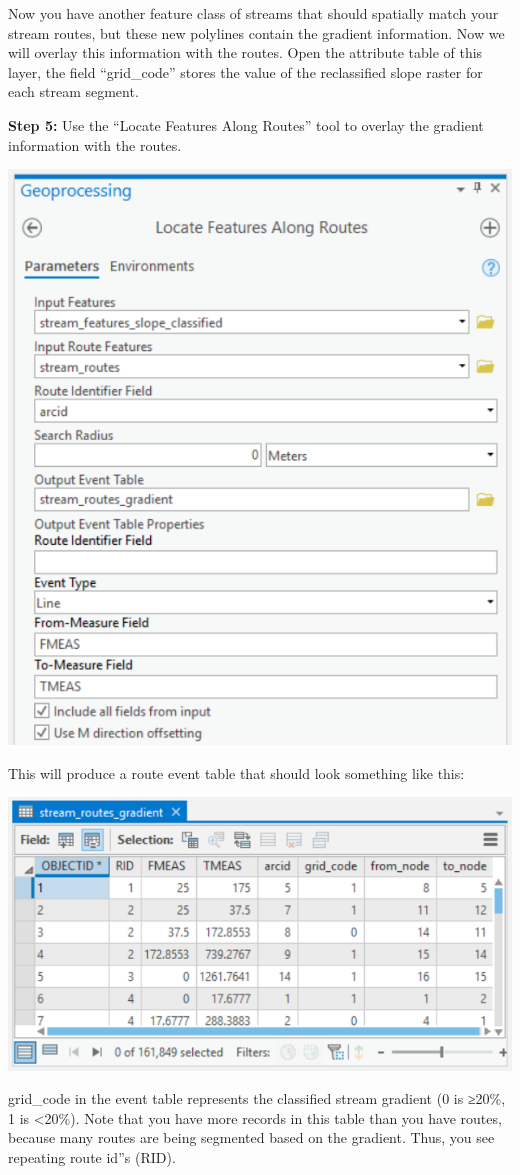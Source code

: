 \documentclass[
]{book}
\begin{document}
Now you have another feature class of streams that should spatially match your stream routes, but these new polylines contain the gradient information. Now we will overlay this information with the routes. Open the attribute table of this layer, the field ``grid\_code'' stores the value of the reclassified slope raster for each stream segment.

\textbf{Step 5:} Use the ``Locate Features Along Routes'' tool to overlay the gradient information with the routes.

\includegraphics[width=0.75\linewidth]{images/02-locate-features-along-routes}

This will produce a route event table that should look something like this:

\includegraphics[width=0.75\linewidth]{images/02-stream-routes-gradient}

grid\_code in the event table represents the classified stream gradient (0 is ≥20\%, 1 is \textless20\%). Note that you have more records in this table than you have routes, because many routes are being segmented based on the gradient. Thus, you see repeating route id''s (RID).
\end{document}
